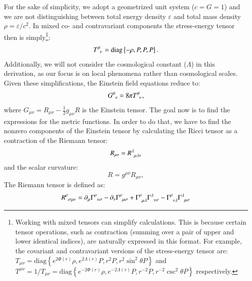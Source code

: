 \documentclass[main.tex]{subfiles}
\begin{document}
    For the sake of simplicity, we adopt a geometrized unit system ($c=G=1$) and we are not distinguishing between total energy density $\varepsilon$ and total mass density $\rho = \varepsilon/c^2$. In mixed co- and contravariant components the stress-energy tensor then is simply\footnote{Working with mixed tensors can simplify calculations. This is because certain tensor operations, such as contraction (summing over a pair of upper and lower identical indices), are naturally expressed in this format. For example, the covariant and contravariant versions of the stress-energy tensor are: $T_{\mu\nu} = \mathrm{diag}\left\{e^{2\Phi(r)}\rho, e^{2\Lambda(r)}P, r^2P, r^2\sin^2\theta P\right\}$ and $T^{\mu\nu} = 1/T_{\mu\nu} = \mathrm{diag}\left\{e^{-2\Phi(r)}\rho, e^{-2\Lambda(r)}P, r^{-2}P, r^{-2}\csc^2\theta P\right\}$ respectively.}:
    \begin{equation}
        T\indices{^\mu_\nu} = \mathrm{diag}\left\{-\rho, P, P, P \right\}.
    \end{equation}
    Additionally, we will not consider the cosmological constant ($\Lambda$) in this derivation, as our focus is on local phenomena rather than cosmological scales. Given these simplifications, the Einstein field equations reduce to:
     \begin{equation}\label{eq:field_equations_mixed}
        G\indices{^\mu_\nu} = 8\pi T\indices{^\mu_\nu},
     \end{equation}
     where $G_{\mu \nu} = R_{\mu \nu} - \frac{1}{2} g_{\mu \nu} R $ is the Einstein tensor. The goal now is to find the expressions for the metric functions. In order to do that, we have to find the nonzero components of the Einstein tensor by calculating the Ricci tensor as a contraction of the Riemann tensor:
     \begin{equation}
         R_{\mu\nu} = R\indices{^\lambda_{\mu\lambda\nu}}
     \end{equation}
     and the scalar curvature:
     \begin{equation}
         R = g^{\mu \nu}R_{\mu \nu},
     \end{equation}
     The Riemann tensor is defined as:
     \begin{equation}
         R\indices{^\rho_{\sigma\mu\nu}} = \partial_\mu \Gamma\indices{^\rho_{\nu\sigma}} - \partial_\nu \Gamma\indices{^\rho_{\mu\sigma}} + \Gamma\indices{^\rho_{\mu\lambda}}\Gamma\indices{^\lambda_{\nu\sigma}} - \Gamma\indices{^\rho_{\nu\lambda}}\Gamma\indices{^\lambda_{\mu\sigma}}
     \end{equation}
\end{document}
